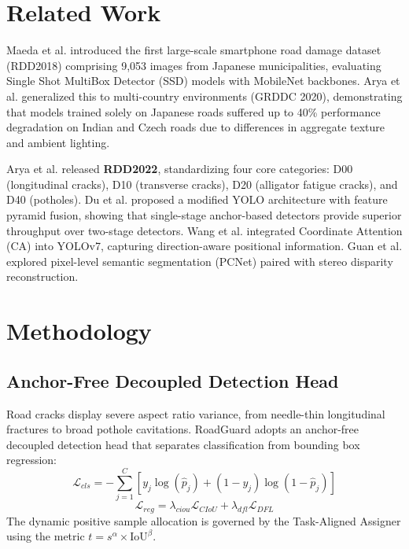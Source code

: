 \documentclass[journal,10pt]{IEEEtran}
\begin{document}
\section{Related Work}
Maeda et al. \cite{maeda2018road} introduced the first large-scale smartphone road damage dataset (RDD2018) comprising 9,053 images from Japanese municipalities, evaluating Single Shot MultiBox Detector (SSD) models with MobileNet backbones. Arya et al. \cite{arya2021deep} generalized this to multi-country environments (GRDDC 2020), demonstrating that models trained solely on Japanese roads suffered up to 40\% performance degradation on Indian and Czech roads due to differences in aggregate texture and ambient lighting.

Arya et al. \cite{arya2022crowdsensing} released \textbf{RDD2022}, standardizing four core categories: D00 (longitudinal cracks), D10 (transverse cracks), D20 (alligator fatigue cracks), and D40 (potholes). Du et al. \cite{du2020pavement} proposed a modified YOLO architecture with feature pyramid fusion, showing that single-stage anchor-based detectors provide superior throughput over two-stage detectors. Wang et al. \cite{wang2022road} integrated Coordinate Attention (CA) into YOLOv7, capturing direction-aware positional information. Guan et al. \cite{guan2021automated} explored pixel-level semantic segmentation (PCNet) paired with stereo disparity reconstruction.

\section{Methodology}

\subsection{Anchor-Free Decoupled Detection Head}
Road cracks display severe aspect ratio variance, from needle-thin longitudinal fractures to broad pothole cavitations. RoadGuard adopts an anchor-free decoupled detection head that separates classification from bounding box regression:
\begin{equation}
\mathcal{L}_{cls} = -\sum_{j=1}^C \left[ y_j \log(\hat{p}_j) + (1 - y_j) \log(1 - \hat{p}_j) \right]
\end{equation}
\begin{equation}
\mathcal{L}_{reg} = \lambda_{ciou} \mathcal{L}_{CIoU} + \lambda_{dfl} \mathcal{L}_{DFL}
\end{equation}
The dynamic positive sample allocation is governed by the Task-Aligned Assigner using the metric $t = s^\alpha \times \text{IoU}^\beta$.
\end{document}
